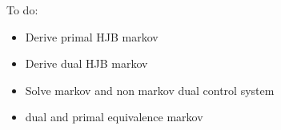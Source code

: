 \documentclass[12pt,twoside]{article}
\begin{document}


\newpage

\tableofcontents

\newpage



\newpage

\newpage
To do:
\begin{itemize}
    \item Derive primal HJB markov
    \item Derive dual HJB markov
    \item Solve markov and non markov dual control system
    \item dual and primal equivalence markov
\end{itemize}
\end{document}
